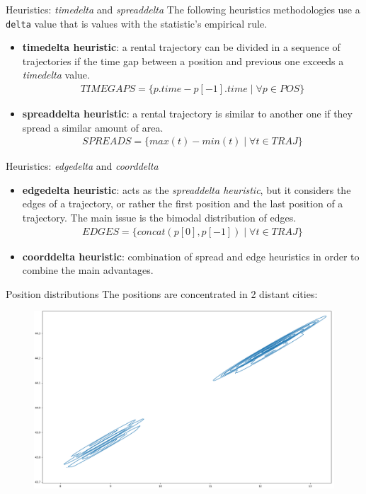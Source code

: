 \documentclass{beamer}
\begin{document}
\begin{frame}{Heuristics: \textit{timedelta} and \textit{spreaddelta}}
The following heuristics methodologies use a \texttt{delta} value that is values with the statistic's empirical rule.
\begin{itemize}
	\item \textbf{timedelta heuristic}: a rental trajectory can be divided in a sequence of trajectories if the time gap between a position and previous one exceeds a \textit{timedelta} value.
	\begin{align}
	TIMEGAPS = \{p.time - p[-1].time \mid \forall p \in POS \}
	\end{align}
	\item \textbf{spreaddelta heuristic}: a rental trajectory is similar to another one if they spread a similar amount of area. 
	\begin{align}
	SPREADS = \{max(t) - min(t) \mid \forall t \in TRAJ \}
	\end{align}
\end{itemize}
\end{frame}

\begin{frame}{Heuristics: \textit{edgedelta} and \textit{coorddelta}}
\begin{itemize}
	\item \textbf{edgedelta heuristic}: acts as the \textit{spreaddelta heuristic}, but it considers the edges of a trajectory, or rather the first position and the last position of a trajectory. The main issue is the bimodal distribution of edges.
	\begin{align}
	EDGES = \{concat(p[0], p[-1]) \mid \forall t \in TRAJ \}
	\end{align}
	\item \textbf{coorddelta heuristic}: combination of spread and edge heuristics in order to combine the main advantages. 
\end{itemize}
\end{frame}

\begin{frame}{Position distributions}
The positions are concentrated in 2 distant cities:
\begin{figure}[bt]
	\centering
	\includegraphics[width=\textwidth]{pos-distributions}
	\label{fig:pos-distributions}
\end{figure}
\end{frame}
\end{document}
